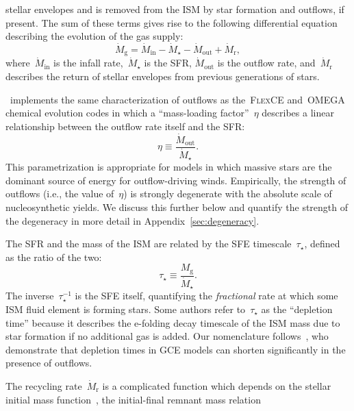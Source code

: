 \documentclass[foo.tex]{subfiles}
\begin{document}
stellar envelopes and is removed from the ISM by star formation and outflows,
if present.
The sum of these terms gives rise to the following differential equation
describing the evolution of the gas supply:
\begin{equation}
\dot{M}_\text{g} = \dot{M}_\text{in} - \dot{M}_\star - \dot{M}_\text{out}
+ \dot{M}_\text{r},
\label{eq:mdotgas}
\end{equation}
where~$\dot{M}_\text{in}$ is the infall rate,~$\dot{M}_\star$ is the SFR,
$\dot{M}_\text{out}$ is the outflow rate, and~$\dot{M}_\text{r}$ describes
the return of stellar envelopes from previous generations of stars.
\par
\vice~implements the same characterization of outflows as the~\textsc{FlexCE}
\citep{Andrews2017} and~\textsc{OMEGA}~\citep{Cote2017} chemical evolution
codes in which a ``mass-loading factor''~$\eta$ describes a linear relationship
between the outflow rate itself and the SFR:
\begin{equation}
\eta \equiv \frac{\dot{M}_\text{out}}{\dot{M}_\star}.
\label{eq:massloading}
\end{equation}
This parametrization is appropriate for models in which massive stars are the
dominant source of energy for outflow-driving winds.
Empirically, the strength of outflows (i.e., the value of~$\eta$) is strongly
degenerate with the absolute scale of nucleosynthetic yields.
We discuss this further below and quantify the strength of the degeneracy in
more detail in Appendix~\ref{sec:degeneracy}.
\par
The SFR and the mass of the ISM are related by the SFE timescale~$\tau_\star$,
defined as the ratio of the two:
\begin{equation}
\tau_\star \equiv \frac{M_\text{g}}{\dot{M}_\star}.
\label{eq:taustar}
\end{equation}
The inverse~$\tau_\star^{-1}$ is the SFE itself, quantifying the
\textit{fractional} rate at which some ISM fluid element is forming stars.
Some authors refer to~$\tau_\star$ as the ``depletion time''
\citep[e.g.,][]{Tacconi2018} because it describes the e-folding decay timescale
of the ISM mass due to star formation if no additional gas is added.
Our nomenclature follows~\citet{Weinberg2017}, who demonstrate that depletion
times in GCE models can shorten significantly in the presence of outflows.
\par
The recycling rate~$\dot{M}_\text{r}$ is a complicated function which depends
on the stellar initial mass function~\citep[IMF; e.g.,][]{Salpeter1955,
Miller1979, Kroupa2001, Chabrier2003}, the initial-final remnant mass relation
\end{document}
